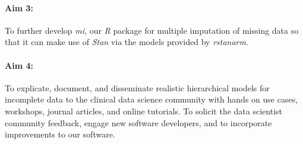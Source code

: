 \documentclass[11pt,notitlepage]{article}
\begin{document}
\paragraph*{Aim 3:} To further develop \textit{mi}, our \textit{R} package for multiple imputation
of missing data so that it can make use of \textit{Stan} via the models provided by \textit{rstanarm}.

\paragraph*{Aim 4:} To explicate, document, and disseminate realistic hierarchical 
models for incomplete data to the clinical data science community with hands on use cases, workshops, journal articles, and 
online tutorials. To solicit the data scientist community feedback, engage new 
software developers, and to incorporate improvements to our software.
\end{document}
